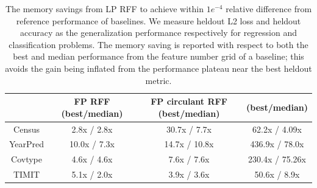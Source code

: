 
\begin{table}
	\centering
	\begin{tabular}{c c c c}
		\hline
		& FP RFF (best/median) & FP circulant RFF (best/median) & \Nystrom (best/median) \\
		\hline
		\hline
		Census & 2.8x / 2.8x & 30.7x / 7.7x & 62.2x / 4.09x \\
		YearPred & 10.0x / 7.3x & 14.7x / 10.8x & 436.9x / 78.0x \\ 
		Covtype & 4.6x / 4.6x & 7.6x / 7.6x & 230.4x / 75.26x \\ 
		TIMIT & 5.1x / 2.0x & 3.9x / 3.6x & 50.6x / 8.9x \\ 
		\hline
	\end{tabular}
	\caption{The memory savings from LP RFF to achieve within $1e^{-4}$ relative difference from reference performance of baselines. We measure heldout L2 loss and heldout accuracy as the generalization performance respectively for regression and classification problems. The memory saving is reported with respect to both the best and median performance from the feature number grid of a baseline; this avoids the gain being inflated from the performance plateau near the best heldout metric. }
	\label{fig:mem_saving}
\end{table}
